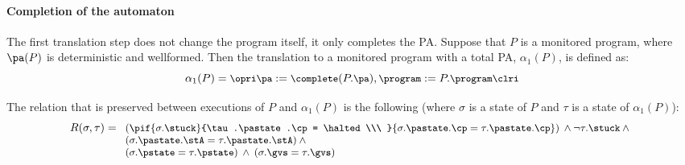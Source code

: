 


\paragraph{Completion of the automaton}
The first translation step does not change the program itself, it only
completes the PA. Suppose that \(P\) is a monitored program, where
\(\pa(P)\) is deterministic and wellformed. Then the translation to a
monitored program with a total PA, \(\alpha_1(P)\), is defined as:
\[{\small
\alpha_1(P) = \opri \pa := \complete(P.\pa), \program := P.\program
\clri
}
\]

The relation that is preserved between executions of \(P\) and
\(\alpha_1(P)\) is the following (where \(\sigma\) is a state of
\(P\) and \(\tau\) is a state of \(\alpha_1(P)\)):
\[{\small
R(\sigma, \tau) =\\
 \begin{array}[t]{l}
  (\pif {\sigma.\stuck}{\tau.\pastate.\cp = \halted\\\ }
        {\sigma.\pastate.\cp = \tau.\pastate.\cp}) \:\wedge
  \neg \tau.\stuck \:\wedge\\
  (\sigma.\pastate.\stA = \tau.\pastate.\stA) \:\wedge\\
  (\sigma.\pstate = \tau.\pstate) \:\wedge\: (\sigma.\gvs = \tau.\gvs)
\end{array}}
\]

